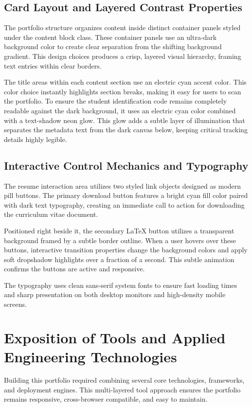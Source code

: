 \documentclass[12pt,a4paper]{article}
\begin{document}
\subsection{Card Layout and Layered Contrast Properties}
The portfolio structure organizes content inside distinct container panels styled under the content block class. These container panels use an ultra-dark background color to create clear separation from the shifting background gradient. This design choices produces a crisp, layered visual hierarchy, framing text entries within clear borders.

The title areas within each content section use an electric cyan accent color. This color choice instantly highlights section breaks, making it easy for users to scan the portfolio. To ensure the student identification code remains completely readable against the dark background, it uses an electric cyan color combined with a text-shadow neon glow. This glow adds a subtle layer of illumination that separates the metadata text from the dark canvas below, keeping critical tracking details highly legible.

\subsection{Interactive Control Mechanics and Typography}
The resume interaction area utilizes two styled link objects designed as modern pill buttons. The primary download button features a bright cyan fill color paired with dark text typography, creating an immediate call to action for downloading the curriculum vitae document. 

Positioned right beside it, the secondary LaTeX button utilizes a transparent background framed by a subtle border outline. When a user hovers over these buttons, interactive transition properties change the background colors and apply soft dropshadow highlights over a fraction of a second. This subtle animation confirms the buttons are active and responsive. 

The typography uses clean sans-serif system fonts to ensure fast loading times and sharp presentation on both desktop monitors and high-density mobile screens.

\section{Exposition of Tools and Applied Engineering Technologies}
Building this portfolio required combining several core technologies, frameworks, and deployment engines. This multi-layered tool approach ensures the portfolio remains responsive, cross-browser compatible, and easy to maintain.
\end{document}
